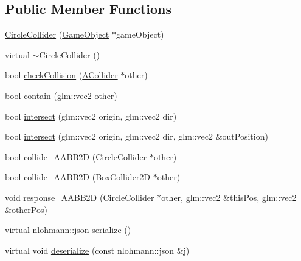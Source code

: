 \subsection*{Public Member Functions}
\begin{DoxyCompactItemize}
\item 
\mbox{\hyperlink{class_beer_engine_1_1_component_1_1_circle_collider_ae79d96d3b73a4a43d9305da69e739ac0}{Circle\+Collider}} (\mbox{\hyperlink{class_beer_engine_1_1_game_object}{Game\+Object}} $\ast$game\+Object)
\item 
virtual \mbox{\hyperlink{class_beer_engine_1_1_component_1_1_circle_collider_ad5e2682e2e9bed78717933e4201326bd}{$\sim$\+Circle\+Collider}} ()
\item 
bool \mbox{\hyperlink{class_beer_engine_1_1_component_1_1_circle_collider_a7443f2cadac6ae282025a6757ad2b3c8}{check\+Collision}} (\mbox{\hyperlink{class_beer_engine_1_1_component_1_1_a_collider}{A\+Collider}} $\ast$other)
\item 
bool \mbox{\hyperlink{class_beer_engine_1_1_component_1_1_circle_collider_a0660c296e993b8bfbebb8524bca4cea7}{contain}} (glm\+::vec2 other)
\item 
bool \mbox{\hyperlink{class_beer_engine_1_1_component_1_1_circle_collider_a60737b2c9898672d28aa09b56c7fa07c}{intersect}} (glm\+::vec2 origin, glm\+::vec2 dir)
\item 
bool \mbox{\hyperlink{class_beer_engine_1_1_component_1_1_circle_collider_a0402e8e6605a5c2c7aefa9befdcd15e5}{intersect}} (glm\+::vec2 origin, glm\+::vec2 dir, glm\+::vec2 \&out\+Position)
\item 
bool \mbox{\hyperlink{class_beer_engine_1_1_component_1_1_circle_collider_a20e45eaf7bb9ca22573e0fda117ae274}{collide\+\_\+\+A\+A\+B\+B2D}} (\mbox{\hyperlink{class_beer_engine_1_1_component_1_1_circle_collider}{Circle\+Collider}} $\ast$other)
\item 
bool \mbox{\hyperlink{class_beer_engine_1_1_component_1_1_circle_collider_a9e88d5908734005d0141a75b8b02fd78}{collide\+\_\+\+A\+A\+B\+B2D}} (\mbox{\hyperlink{class_beer_engine_1_1_component_1_1_box_collider2_d}{Box\+Collider2D}} $\ast$other)
\item 
void \mbox{\hyperlink{class_beer_engine_1_1_component_1_1_circle_collider_aeec35819ad13cf21e80745d3a1ae9651}{response\+\_\+\+A\+A\+B\+B2D}} (\mbox{\hyperlink{class_beer_engine_1_1_component_1_1_circle_collider}{Circle\+Collider}} $\ast$other, glm\+::vec2 \&this\+Pos, glm\+::vec2 \&other\+Pos)
\item 
virtual nlohmann\+::json \mbox{\hyperlink{class_beer_engine_1_1_component_1_1_circle_collider_a9898927635bb575aa2895cc5516433fc}{serialize}} ()
\item 
virtual void \mbox{\hyperlink{class_beer_engine_1_1_component_1_1_circle_collider_a25651d52d7b584deb7f82b09037124d5}{deserialize}} (const nlohmann\+::json \&j)
\end{DoxyCompactItemize}
